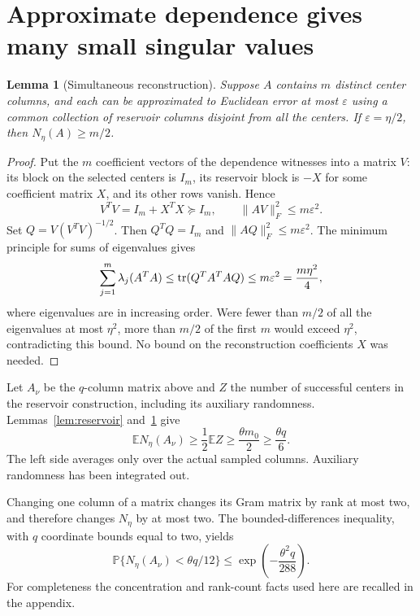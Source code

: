 \documentclass[11pt]{article}
\newtheorem{lemma}[theorem]{Lemma}
\theoremstyle{remark}\newtheorem{remark}[theorem]{Remark}
\newcommand{\E}{\mathbb E}\newcommand{\PP}{\mathbb P}
\begin{document}
\section{Approximate dependence gives many small singular values}
\begin{lemma}[Simultaneous reconstruction]\label{lem:subspace}
Suppose $A$ contains $m$ distinct center columns, and each can be approximated to Euclidean error at most $\varepsilon$ using a common collection of reservoir columns disjoint from all the centers. If $\varepsilon=\eta/2$, then $N_\eta(A)\ge m/2$.
\end{lemma}
\begin{proof}
Put the $m$ coefficient vectors of the dependence witnesses into a matrix $V$: its block on the selected centers is $I_m$, its reservoir block is $-X$ for some coefficient matrix $X$, and its other rows vanish. Hence
\[
 V^TV=I_m+X^TX\succeq I_m,\qquad \|AV\|_F^2\le m\varepsilon^2.
\]
Set $Q=V(V^TV)^{-1/2}$. Then $Q^TQ=I_m$ and $\|AQ\|_F^2\le m\varepsilon^2$. The minimum principle for sums of eigenvalues gives
\[
 \sum_{j=1}^m\lambda_j(A^TA)\le\operatorname{tr}(Q^TA^TAQ)
 \le m\varepsilon^2=\frac{m\eta^2}{4},
\]
where eigenvalues are in increasing order. Were fewer than $m/2$ of all the eigenvalues at most $\eta^2$, more than $m/2$ of the first $m$ would exceed $\eta^2$, contradicting this bound. No bound on the reconstruction coefficients $X$ was needed.
\end{proof}

Let $A_\nu$ be the $q$-column matrix above and $Z$ the number of successful centers in the reservoir construction, including its auxiliary randomness. Lemmas~\ref{lem:reservoir} and~\ref{lem:subspace} give
\[
 \E N_\eta(A_\nu)\ge\frac12\E Z\ge\frac{\theta m_0}{2}
 \ge\frac{\theta q}{6}.
\]
The left side averages only over the actual sampled columns. Auxiliary randomness has been integrated out.

Changing one column of a matrix changes its Gram matrix by rank at most two, and therefore changes $N_\eta$ by at most two. The bounded-differences inequality, with $q$ coordinate bounds equal to two, yields
\begin{equation}\label{eq:concentration}
 \PP\{N_\eta(A_\nu)<\theta q/12\}
 \le \exp\left(-\frac{\theta^2q}{288}\right).
\end{equation}
For completeness the concentration and rank-count facts used here are recalled in the appendix.
\end{document}
